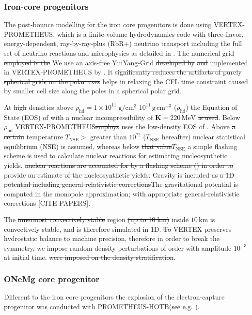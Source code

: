 \documentclass[fleqn,usenatbib]{mnras}
\newcommand{\gcc}{\text{g}\, \text{cm}^{-3}}
\newcommand{\prom}{\textsc{P{\footnotesize ROMETHEUS}-H{\footnotesize OT}B}\xspace}
\newcommand{\vertexprom}{\textsc{V{\footnotesize ERTEX}-P{\footnotesize ROMETHEUS}}\xspace}
\newcommand{\vertex}{\textsc{V{\footnotesize ERTEX}}\xspace}
\newcommand{\NY}[2]{{\color{blue}\sout{#1}#2}}
\begin{document}
\subsubsection{Iron-core progenitors}
\NY{}{The post-bounce modelling for the iron core progenitors is done using} \vertexprom\NY{}{, which} is a finite-volume hydrodynamics code with three-flavor, energy-dependent, ray-by-ray-plus (RbR+) neutrino transport including the full set of neutrino reactions and microphysics as detailed in \cite{Rampp2002}.  \NY{The numerical grid employed is the}{ We use an} axis-free YinYang-Grid \NY{developed by}{} \cite{Kageyama2004} \NY{and}{} implemented in \vertexprom by \cite{Melson2015}. It \NY{significantly reduces the artifacts of purely spherical grids on the polar axes}{ helps in relaxing the CFL time constraint caused by smaller cell size along the poles in a spherical polar grid}. 

At \NY{high}{} densities above \NY{$\rho_{\mathrm{hd}}=1\times10^{11}\;\mathrm{g/cm^3}$}{  $10^{11}\,\gcc$ ($\rho_{\text{hd}}$)} the Equation of State (EOS) of \cite{Lattimer1991} with a nuclear incompressibility of $\mathbf{K}=220\, \text{MeV}$ \NY{is used}{}. Below $\rho_{\text{hd}}$ \vertexprom \NY{employs}{ uses} the low-density EOS of \cite{Janka1999Unpublished}. Above \NY{a certain}{} temperature \NY{$T_{\text{NSE}}>$}{ greater than $10^{??}$ ($T_{\text{NSE}}$ hereafter)} nuclear statistical equilibrium \NY{}{(NSE)} is assumed, whereas below \NY{that value}{$T_{\text{NSE}}$ a simple flashing scheme is used to calculate nuclear reactions for estimating nucleosynthetic yields.} \NY{nuclear reactions are accounted for by a flashing scheme (\cite{Ramppa}) in order to provide an estimate of the nucleosynthetic yields.}{} \NY{Gravity is included as a 1D potential including general-relativistic corrections}{The gravitational potential is computed in the monopole approximation; with appropriate general-relativistic corrections [CITE PAPERS]}.

The \NY{innermost convectively stable}{} region \NY{(up to 10 km)}{ inside $10\,\text{km}$ is  convectively stable, and is therefore} simulated in 1D. \NY{To}{ \vertex preserves hydrostatic balance to machine precision, therefore in order to} break the symmetry\NY{}{, we impose} random \NY{}{density} perturbations \NY{of order}{ with amplitude} $10^{-3}$ \NY{}{at initial time}. \NY{were imposed on the density stratification}{}.
\subsubsection{ONeMg core progenitor}
Different to the iron core progenitors the explosion of the electron-capture progenitor was conducted with \prom (see e.g. \citet{Wongwathanarat2012,Wongwathanarat2013}).
\end{document}
